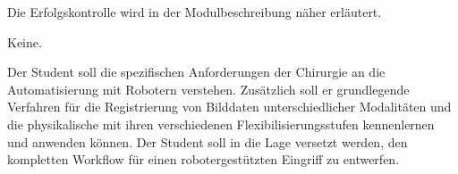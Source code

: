 \begin{course}

\setdoclanguagegerman
{}



\coursehead


\label{cour_7135.dp_997}


\begin{styleenv}
\begin{assessment}
Die Erfolgskontrolle wird in der Modulbeschreibung näher erläutert.


\end{assessment}

\begin{conditions}Keine.\end{conditions}


\end{styleenv}

\begin{learningoutcomes}
Der Student soll die spezifischen Anforderungen der Chirurgie an die Automatisierung mit Robotern verstehen. Zusätzlich soll er grundlegende Verfahren für die Registrierung von Bilddaten unterschiedlicher Modalitäten und die physikalische mit ihren verschiedenen Flexibilisierungsstufen kennenlernen und anwenden können. Der Student soll in die Lage versetzt werden, den kompletten Workflow für einen robotergestützten Eingriff zu entwerfen.


\end{learningoutcomes}


\end{course}
